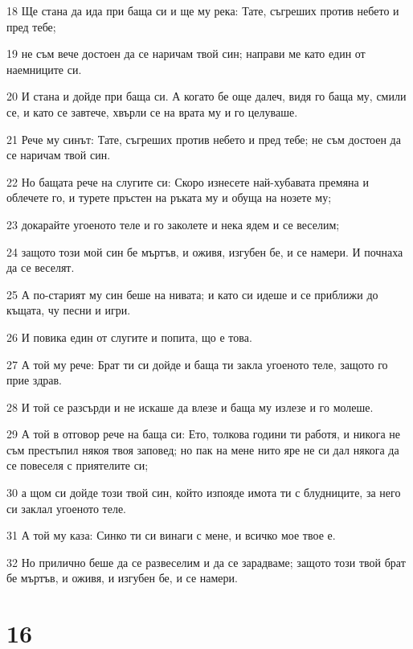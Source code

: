 \par 18 Ще стана да ида при баща си и ще му река: Тате, съгреших против небето и пред тебе;
\par 19 не съм вече достоен да се наричам твой син; направи ме като един от наемниците си.
\par 20 И стана и дойде при баща си. А когато бе още далеч, видя го баща му, смили се, и като се завтече, хвърли се на врата му и го целуваше.
\par 21 Рече му синът: Тате, съгреших против небето и пред тебе; не съм достоен да се наричам твой син.
\par 22 Но бащата рече на слугите си: Скоро изнесете най-хубавата премяна и облечете го, и турете пръстен на ръката му и обуща на нозете му;
\par 23 докарайте угоеното теле и го заколете и нека ядем и се веселим;
\par 24 защото този мой син бе мъртъв, и оживя, изгубен бе, и се намери. И почнаха да се веселят.
\par 25 А по-старият му син беше на нивата; и като си идеше и се приближи до къщата, чу песни и игри.
\par 26 И повика един от слугите и попита, що е това.
\par 27 А той му рече: Брат ти си дойде и баща ти закла угоеното теле, защото го прие здрав.
\par 28 И той се разсърди и не искаше да влезе и баща му излезе и го молеше.
\par 29 А той в отговор рече на баща си: Ето, толкова години ти работя, и никога не съм престъпил някоя твоя заповед; но пак на мене нито яре не си дал някога да се повеселя с приятелите си;
\par 30 а щом си дойде този твой син, който изпояде имота ти с блудниците, за него си заклал угоеното теле.
\par 31 А той му каза: Синко ти си винаги с мене, и всичко мое твое е.
\par 32 Но прилично беше да се развеселим и да се зарадваме; защото този твой брат бе мъртъв, и оживя, и изгубен бе, и се намери.

\chapter{16}

